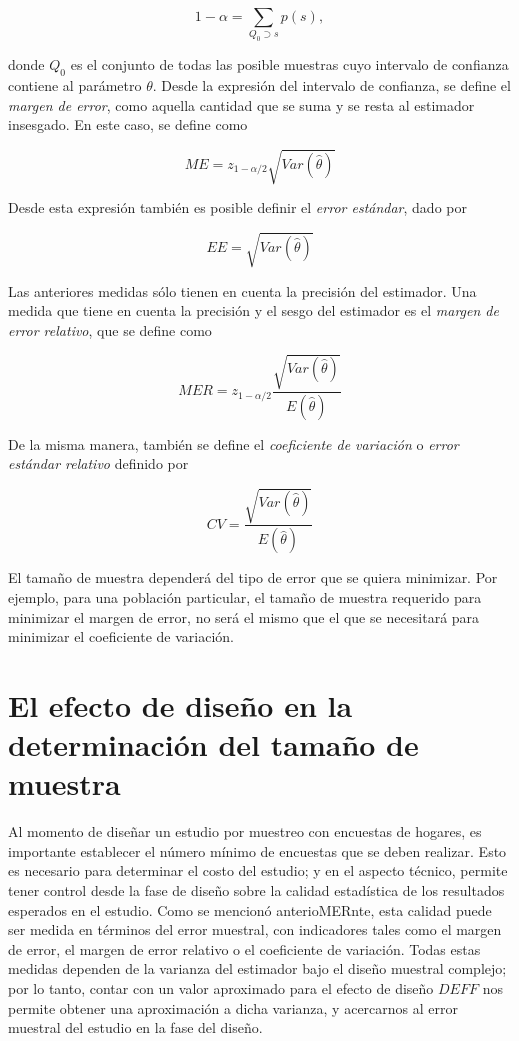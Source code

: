 \documentclass[
  12pt,
  spanish,
]{book}
\begin{document}
\[
1-\alpha=\sum_{Q_0 \supset s}p(s),
\]

donde \(Q_0\) es el conjunto de todas las posible muestras cuyo intervalo de confianza contiene al parámetro \(\theta\). Desde la expresión del intervalo de confianza, se define el \emph{margen de error}, como aquella cantidad que se suma y se resta al estimador insesgado. En este caso, se define como

\[
ME = z_{1-\alpha / 2}\sqrt{ Var(\hat{\theta})}
\]

Desde esta expresión también es posible definir el \emph{error estándar}, dado por

\[
EE = \sqrt{ Var(\hat{\theta})}
\]

Las anteriores medidas sólo tienen en cuenta la precisión del estimador. Una medida que tiene en cuenta la precisión y el sesgo del estimador es el \emph{margen de error relativo}, que se define como

\[
MER = z_{1-\alpha / 2}\frac{\sqrt{ Var(\hat{\theta})}}{E(\hat{\theta})}
\]

De la misma manera, también se define el \emph{coeficiente de variación} o \emph{error estándar relativo} definido por

\[
CV =  \frac{\sqrt{ Var(\hat{\theta})}}{E(\hat{\theta})}
\]

El tamaño de muestra dependerá del tipo de error que se quiera minimizar. Por ejemplo, para una población particular, el tamaño de muestra requerido para minimizar el margen de error, no será el mismo que el que se necesitará para minimizar el coeficiente de variación.

\hypertarget{el-efecto-de-diseuxf1o-en-la-determinaciuxf3n-del-tamauxf1o-de-muestra}{%
\section{El efecto de diseño en la determinación del tamaño de muestra}\label{el-efecto-de-diseuxf1o-en-la-determinaciuxf3n-del-tamauxf1o-de-muestra}}

Al momento de diseñar un estudio por muestreo con encuestas de hogares, es importante establecer el número mínimo de encuestas que se deben realizar. Esto es necesario para determinar el costo del estudio; y en el aspecto técnico, permite tener control desde la fase de diseño sobre la calidad estadística de los resultados esperados en el estudio. Como se mencionó anterioMERnte, esta calidad puede ser medida en términos del error muestral, con indicadores tales como el margen de error, el margen de error relativo o el coeficiente de variación. Todas estas medidas dependen de la varianza del estimador bajo el diseño muestral complejo; por lo tanto, contar con un valor aproximado para el efecto de diseño \(DEFF\) nos permite obtener una aproximación a dicha varianza, y acercarnos al error muestral del estudio en la fase del diseño.
\end{document}
